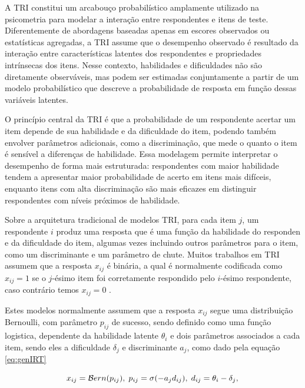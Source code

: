  A \gls{TRI} constitui um arcabouço probabilístico amplamente utilizado na psicometria para modelar a interação entre respondentes e itens de teste. Diferentemente de abordagens baseadas apenas em escores observados ou estatísticas agregadas, a \gls{TRI} assume que o desempenho observado é resultado da interação entre características latentes dos respondentes e propriedades intrínsecas dos itens. Nesse contexto, habilidades e dificuldades não são diretamente observáveis, mas podem ser estimadas conjuntamente a partir de um modelo probabilístico que descreve a probabilidade de resposta em função dessas variáveis latentes.

O princípio central da \gls{TRI} é que a probabilidade de um respondente acertar um item depende de sua habilidade e da dificuldade do item, podendo também envolver parâmetros adicionais, como a discriminação, que mede o quanto o item é sensível a diferenças de habilidade. Essa modelagem permite interpretar o desempenho de forma mais estruturada: respondentes com maior habilidade tendem a apresentar maior probabilidade de acerto em itens mais difíceis, enquanto itens com alta discriminação são mais eficazes em distinguir respondentes com níveis próximos de habilidade.

Sobre a arquitetura tradicional de modelos \gls{TRI}, para cada item $j$, um respondente $i$ produz uma resposta que é uma função da habilidade do responden e da dificuldade do item, algumas vezes incluindo outros parâmetros para o item, como um discriminante e um parâmetro de chute. Muitos trabalhos em \gls{TRI} assumem que a resposta $x_{ij}$ é binária, a qual é normalmente codificada como $x_{ij} = 1$ se o $j$-ésimo item foi corretamente respondido pelo $i$-ésimo respondente, caso contrário temos $x_{ij} = 0$ \cite{bachrach2012grade,embretson2013item,martinez2016making,twomey2022equitable}.

Estes modelos normalmente assumem que a resposta $x_{ij}$ segue uma distribuição Bernoulli, com parâmetro $p_{ij}$ de sucesso, sendo definido como uma função logistica, dependente da habilidade latente $\theta_i$ e dois parâmetros associados a cada item, sendo eles a dificuldade $\delta_j$ e discriminante $a_j$, como dado pela equação \ref{eq:genIRT}

\begin{equation} 
\label{eq:genIRT}
    x_{ij} = {\mathcal{B}ern}(p_{ij}),\; 
    p_{ij} = \sigma(-{a_j} d_{ij}),\;
    d_{ij} = {\theta_i-\delta_j},\\ 
\end{equation}

